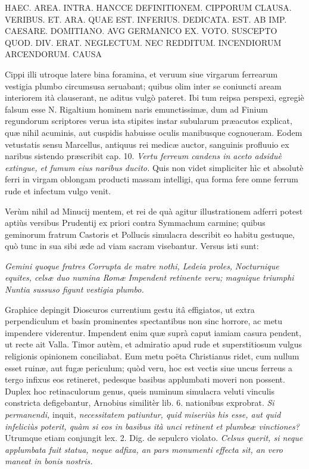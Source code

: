 \documentclass[a4paper, 11pt, oneside, polutonikogreek, latin]{article}
\begin{document}
HAEC. AREA. INTRA. HANCCE
DEFINITIONEM. CIPPORUM
CLAUSA. VERIBUS. ET. ARA. QUAE
EST. INFERIUS. DEDICATA. EST. AB
IMP. CAESARE. DOMITIANO. AVG
GERMANICO EX. VOTO. SUSCEPTO
QUOD. DIV. ERAT. NEGLECTUM. NEC
REDDITUM. INCENDIORUM
ARCENDORUM. CAUSA

Cippi illi utroque latere bina foramina, et veruum siue virgarum ferrearum vestigia plumbo circumsusa seruabant; quibus olim inter se coniuncti aream interiorem ità clauserant, ne aditus vulgò pateret. Ibi tum reipsa perspexi, egregiè falsum esse N. Rigaltium hominem naris emunctissimæ, dum ad Finium regundorum scriptores verua ista stipites instar subularum præacutos explicat, quæ nihil acuminis, aut cuspidis habuisse oculis manibusque cognoueram. Eodem vetustatis sensu Marcellus, antiquus rei medicæ auctor, sanguinis profluuio ex naribus sistendo præscribit cap. 10. \emph{Vertu ferreum candens in aceto adsiduè extingue, et fumum eius naribus ducito.} Quis non videt simpliciter hìc et absolutè ferri in virgam oblongam producti massam intelligi, qua forma fere omne ferrum rude et infectum vulgo venit.

Verùm nihil ad Minucij mentem, et rei de quà agitur illustrationem adferri potest aptiùs versibus Prudentij ex priori contra Symmachum carmine; quibus geminorum fratrum Castoris et Pollucis simulacra describit eo habitu gestuque, quò tunc in sua sibi æde ad viam sacram visebantur. Versus isti sunt:

\emph{Gemini quoque fratres}
\emph{Corrupta de matre nothi, Ledeia proles,}
\emph{Nocturnique equites, celsæ duo numina Romæ}
\emph{Impendent retinente veru; magnique triumphi}
\emph{Nuntia sussuso figunt vestigia plumbo.}

Graphice depingit Dioscuros currentium gestu itâ effigiatos, ut extra perpendiculum et basin prominentes spectantibus non sinc horrore, ac metu impendere viderentur. Impendent enim quæ suprà caput iamiam casura pendent, ut recte ait Valla. Timor autèm, et admiratio apud rude et superstitiosum vulgus religionis opinionem conciliabat. Eum metu poëta Christianus ridet, cum nullum esset ruinæ, aut fugæ periculum; quòd veru, hoc est vectis siue uncus ferreus a tergo infixus eos retineret, pedesque basibus applumbati moveri non possent. Duplex hoc retinaculorum genus, queis numinum simulacra veluti vinculis constricta defigebantur, Arnobius similitèr lib. 6. nationibus exprobrat. \emph{Si permanendi,} inquit, \emph{necessitatem patiuntur, quid miseriùs his esse, aut quid infeliciùs poterit, quàm si eos in basibus ità unci retinent et plumbeæ vinctiones?} Utrumque etiam conjungit lex. 2. Dig. de sepulcro violato. \emph{Celsus querit, si neque applumbata fuit statua, neque adfixa, an pars monumenti effecta sit, an vero maneat in bonis nostris.}
\end{document}
